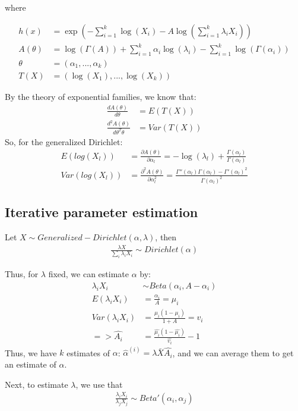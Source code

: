 \documentclass[ba]{imsart}
\numberwithin{equation}{section}
\theoremstyle{plain}
\begin{document}
where

\begin{align*}
h(x) & = \exp \left( -\sum_{i=1}^k \log(X_i) -A \log(\sum_{i=1}^k
  \lambda_i X_i) \right) \\
A(\theta) &= \log(\Gamma(A)) + \sum_{i=1}^k \alpha_i \log(\lambda_i) 
  -\sum_{i=1}^k \log(\Gamma(\alpha_i)) \\
\theta &= (\alpha_1,...,\alpha_k) \\
T(X) &= (\log(X_1),...,\log(X_k))
\end{align*}

By the theory of exponential families, we know that:
\begin{align*}
\frac{d A(\theta)}{d \theta} &= E(T(X)) \\
\frac{d^2 A(\theta)}{d \theta^T \theta} &= Var(T(X))
\end{align*}
So, for the generalized Dirichlet:
\begin{align*}
E(log(X_l)) &= \frac{\partial A(\theta)}{\partial \alpha_l} =
-\log(\lambda_l) + \frac{\Gamma(\alpha_l)}{\Gamma(\alpha_l)} \\
Var(log(X_l)) &= \frac{\partial^2 A(\theta)}{\partial \alpha_l^2} = \frac{\Gamma''(\alpha_l)\Gamma(\alpha_l)-\Gamma'(\alpha_l)^2}{\Gamma(\alpha_l)^2}
\end{align*}

\subsection{Iterative parameter estimation}

Let $X \sim Generalized-Dirichlet(\alpha,\lambda)$, then
\begin{align*}
\frac{\lambda X}{\sum_i \lambda_iX_i} \sim Dirichlet(\alpha)
\end{align*}

Thus, for $\lambda$ fixed, we can estimate $\alpha$ by:
\begin{align*}
\lambda_iX_i &\sim Beta(\alpha_i,A-\alpha_i) \\
E(\lambda_iX_i) &= \frac{\alpha_i}{A} = \mu_i \\
Var(\lambda_iX_i) &= \frac{\mu_i(1-\mu_i)}{1+A} = v_i \\
=> \hat{A_i} &= \frac{\hat{\mu_i}(1-\hat{\mu_i})}{\hat{v_i}} -1
\end{align*}
Thus, we have $k$ estimates of $\alpha$: $\hat{\alpha}^{(i)}=\lambda
\bar{X} \hat{A_i}$, and we can average them to get an estimate of $\alpha$.

Next, to estimate $\lambda$, we use that
\begin{align*}
\frac{\lambda_iX_i}{\lambda_jX_j} \sim Beta'(\alpha_i,\alpha_j)
\end{align*}
\end{document}
